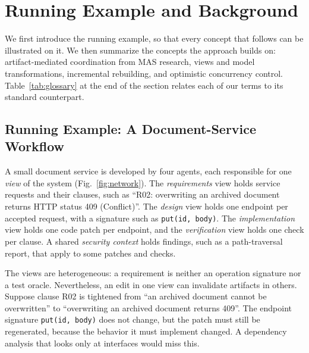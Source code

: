\section{Running Example and Background}\label{sec:background}
We first introduce the running example, so that every concept that follows can be illustrated on it. We then summarize the concepts the approach builds on: artifact-mediated coordination from MAS research, views and model transformations, incremental rebuilding, and optimistic concurrency control. Table~\ref{tab:glossary} at the end of the section relates each of our terms to its standard counterpart.

\subsection{Running Example: A Document-Service Workflow}\label{sec:motivation}
A small document service is developed by four agents, each responsible for one \emph{view} of the system (Fig.~\ref{fig:network}). The \emph{requirements} view holds service requests and their clauses, such as ``R02: overwriting an archived document returns HTTP status 409 (Conflict)''. The \emph{design} view holds one endpoint per accepted request, with a signature such as \texttt{put(id, body)}. The \emph{implementation} view holds one code patch per endpoint, and the \emph{verification} view holds one check per clause. A shared \emph{security context} holds findings, such as a path-traversal report, that apply to some patches and checks.

The views are heterogeneous: a requirement is neither an operation signature nor a test oracle. Nevertheless, an edit in one view can invalidate artifacts in others. Suppose clause R02 is tightened from ``an archived document cannot be overwritten'' to ``overwriting an archived document returns 409''. The endpoint signature \texttt{put(id, body)} does not change, but the patch must still be regenerated, because the behavior it must implement changed. A dependency analysis that looks only at interfaces would miss this.


